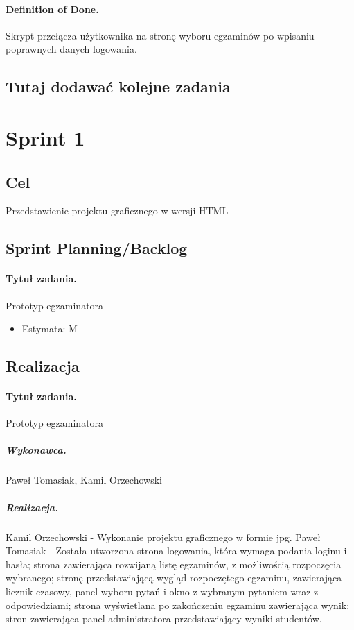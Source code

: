 \documentclass[a4paper]{article}
\begin{document}
\paragraph{Definition of Done.} Skrypt przełącza użytkownika na stronę wyboru egzaminów po wpisaniu poprawnych danych logowania. 

\subsection*{Tutaj dodawać kolejne zadania}

\section{Sprint 1} 
\subsection{Cel} Przedstawienie projektu graficznego w wersji HTML
\subsection{Sprint Planning/Backlog}

\paragraph{Tytuł zadania.} Prototyp egzaminatora
\begin{itemize}
\item Estymata: M
\end{itemize}

\subsection{Realizacja}

\paragraph{Tytuł zadania.} Prototyp egzaminatora
\subparagraph{Wykonawca.} Paweł Tomasiak, Kamil Orzechowski
\subparagraph{Realizacja.} Kamil Orzechowski - Wykonanie projektu graficznego w formie jpg.
Paweł Tomasiak - Została utworzona strona logowania, która wymaga podania loginu i hasła; strona zawierająca rozwijaną listę egzaminów, z możliwością rozpoczęcia wybranego; stronę przedstawiającą wygląd rozpoczętego egzaminu, zawierająca licznik czasowy, panel wyboru pytań i okno z wybranym pytaniem wraz z odpowiedziami; strona wyświetlana po zakończeniu egzaminu zawierająca wynik; stron zawierająca panel administratora przedstawiający wyniki studentów.
\end{document}
